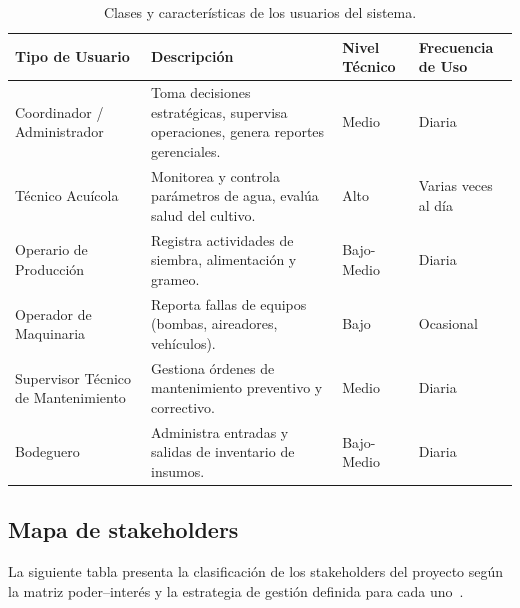 \documentclass[11pt,a4paper]{article}
\begin{document}
\begin{longtable}{|p{4cm}|p{5cm}|p{2.8cm}|p{3cm}|}
\caption{Clases y características de los usuarios del sistema.}
\label{tab:usuarios} \\
\hline
\textbf{Tipo de Usuario} & \textbf{Descripción} & \textbf{Nivel Técnico} & \textbf{Frecuencia de Uso} \\
\hline
Coordinador / Administrador & Toma decisiones estratégicas, supervisa operaciones, genera reportes gerenciales. & Medio & Diaria \\
\hline
Técnico Acuícola & Monitorea y controla parámetros de agua, evalúa salud del cultivo. & Alto & Varias veces al día \\
\hline
Operario de Producción & Registra actividades de siembra, alimentación y grameo. & Bajo-Medio & Diaria \\
\hline
Operador de Maquinaria & Reporta fallas de equipos (bombas, aireadores, vehículos). & Bajo & Ocasional \\
\hline
Supervisor Técnico de Mantenimiento & Gestiona órdenes de mantenimiento preventivo y correctivo. & Medio & Diaria \\
\hline
Bodeguero & Administra entradas y salidas de inventario de insumos. & Bajo-Medio & Diaria \\
\hline
\end{longtable}

\vspace{0.3cm}


\subsection{Mapa de stakeholders}
La siguiente tabla presenta la clasificación de los stakeholders del proyecto según la matriz poder--interés y la estrategia de gestión definida para cada uno~\cite{stakeholder_elicitation_2021}.
\end{document}

